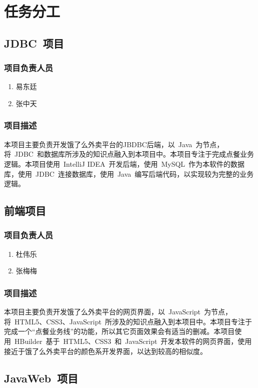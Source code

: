 \chapter{任务分工}
\section{JDBC~项目}
\subsection{项目负责人员}
\begin{enumerate}
    \item{易东廷}
    \item{张中天}
\end{enumerate}
\subsection{项目描述}
本项目主要负责开发饿了么外卖平台的JBDBC后端，以~Java~为节点，将~JDBC~和数据库所涉及的知识点融入到本项目中。本项目专注于完成点餐业务逻辑。本项目使用~IntelliJ IDEA~开发后端，使用~MySQL~作为本软件的数据库，使用~JDBC~连接数据库，使用~Java~编写后端代码，以实现较为完整的业务逻辑。

\section{前端项目}
\subsection{项目负责人员}
\begin{enumerate}
    \item{杜伟乐}
    \item{张梅梅}
\end{enumerate}
\subsection{项目描述}
本项目主要负责开发饿了么外卖平台的网页界面，以~JavaScript~为节点，将~HTML5、CSS3、JavaScript~所涉及的知识点融入到本项目中。本项目专注于完成一个“点餐业务线”的功能，所以其它页面效果会有适当的删减。本项目使用~HBuilder~基于~HTML5、CSS3~和~JavaScript~开发本软件的网页界面，使用接近于饿了么外卖平台的颜色系开发界面，以达到较高的相似度。

\section{JavaWeb~项目}
